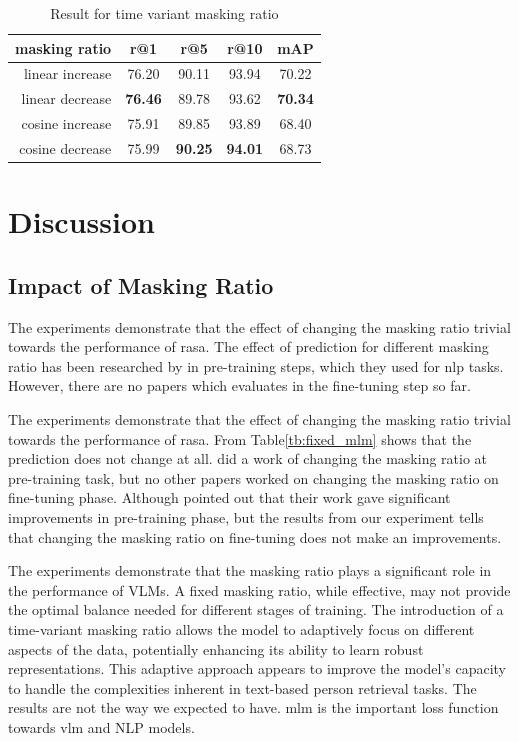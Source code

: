 \begin{table}[htbp]
  \centering
  \caption{Result for time variant masking ratio}
  \label{tb:mrtd_time_variant}
  \begin{tabular}{rcccc}
    \centering
    masking ratio & r@1 & r@5 & r@10 & mAP\\ \hline
    linear increase & 76.20 & 90.11 & 93.94 & 70.22 \\
    linear decrease & \textbf{76.46} & 89.78 & 93.62 & \textbf{70.34} \\
    cosine increase & 75.91 & 89.85 & 93.89 & 68.40 \\
    cosine decrease & 75.99 & \textbf{90.25} & \textbf{94.01} & 68.73 \\
  \end{tabular}
\end{table}


\section{Discussion}
\subsection{Impact of Masking Ratio}

The experiments demonstrate that the effect of changing the masking ratio trivial towards the performance of \acrshort{rasa}. 
The effect of prediction for different masking ratio has been researched by \cite{yang2023learningbettermaskingbetter} in pre-training steps, which they used for \acrshort{nlp} tasks. However, there are no papers which evaluates in the fine-tuning step so far.

The experiments demonstrate that the effect of changing the masking ratio trivial towards the performance of \acrshort{rasa}. From Table\ref{tb:fixed_mlm} shows that the prediction does not change at all. \cite{yang2023learningbettermaskingbetter} did a work of changing the masking ratio at pre-training task, but no other papers worked on changing the masking ratio on fine-tuning phase. 
Although \cite{yang2023learningbettermaskingbetter} pointed out that their work gave significant improvements in pre-training phase, but the results from our experiment tells that changing the masking ratio on fine-tuning does not make an improvements.

The experiments demonstrate that the masking ratio plays a significant role in the performance of VLMs. A fixed masking ratio, while effective, may not provide the optimal balance needed for different stages of training. The introduction of a time-variant masking ratio allows the model to adaptively focus on different aspects of the data, potentially enhancing its ability to learn robust representations. This adaptive approach appears to improve the model's capacity to handle the complexities inherent in text-based person retrieval tasks.
The results are not the way we expected to have. \acrshort{mlm} is the important loss function towards \acrshort{vlm} and NLP models. 


